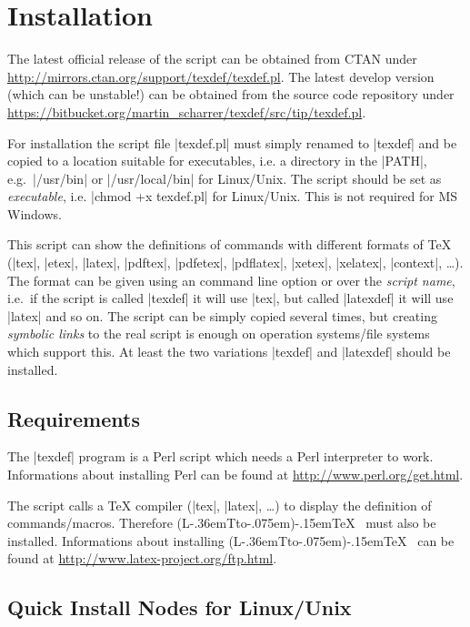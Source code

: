 \documentclass{ydoc}
\makeatletter
\DeclareRobustCommand{\LATeX}{%
    (L\kern -.36em{\sbox \z@ T\vbox to\ht \z@ {\hbox {\check@mathfonts \fontsize \sf@size \z@ \math@fontsfalse \selectfont A}\vss }}\kern -.075em)\kern -.15em\TeX
}
\makeatother
\begin{document}
\section{Installation}\label{sec:install}

The latest official release of the script can be obtained from CTAN under \url{http://mirrors.ctan.org/support/texdef/texdef.pl}.
The latest develop version (which can be unstable!) can be obtained from the source code repository under 
\url{https://bitbucket.org/martin_scharrer/texdef/src/tip/texdef.pl}.

For installation the script file |texdef.pl| must simply renamed to |texdef| and be copied to a location suitable for executables,
i.e. a directory in the |PATH|, e.g.\ |/usr/bin| or |/usr/local/bin| for Linux/Unix.
The script should be set as \emph{executable}, i.e. |chmod +x texdef.pl| for Linux/Unix.
This is not required for MS Windows.

This script can show the definitions of commands with different formats of TeX
(|tex|, |etex|, |latex|, |pdftex|, |pdfetex|, |pdflatex|, |xetex|, |xelatex|, |context|, \ldots).
The format can be given using an command line option or over the \emph{script name},
i.e.\ if the script is called |texdef| it will use |tex|, but called |latexdef|
it will use |latex| and so on.
The script can be simply copied several times, but creating \emph{symbolic links}
to the real script is enough on operation systems/file systems which support
this.
At least the two variations |texdef| and |latexdef| should be installed.


\subsection*{Requirements}

The |texdef| program is a Perl script which needs a Perl interpreter to work.
Informations about installing Perl can be found at \url{http://www.perl.org/get.html}.

The script calls a TeX compiler (|tex|, |latex|, \ldots) to display the definition of commands/macros.
Therefore \LATeX\ must also be installed.
Informations about installing \LATeX\ can be found at \url{http://www.latex-project.org/ftp.html}.




\subsection*{Quick Install Nodes for Linux/Unix}
\end{document}
